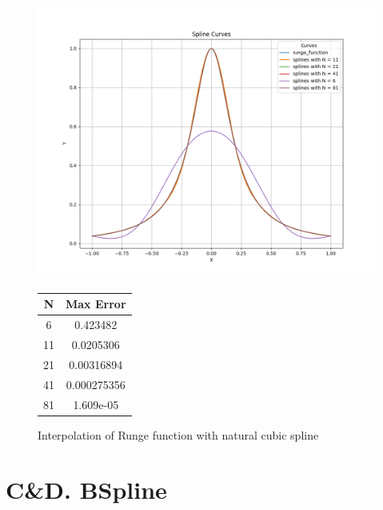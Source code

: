 \documentclass[a4paper]{article}
\begin{document}
\begin{figure}[h]
  \centering
  \begin{minipage}{0.6\textwidth} %
    \centering
    \includegraphics[width=\linewidth]{figures/A.png}
    \caption{Interpolation of Runge function with natural cubic spline}
    \label{fig:runge_interpolation}
  \end{minipage}
  \hfill 
  \begin{minipage}{0.35\textwidth} %
    \centering
    \renewcommand{\arraystretch}{1.2} %
    \begin{tabular}{|c|c|}
      \hline
      \textbf{N} & \textbf{Max Error} \\ \hline
      6  & 0.423482    \\ \hline
      11 & 0.0205306   \\ \hline
      21 & 0.00316894  \\ \hline
      41 & 0.000275356 \\ \hline
      81 & 1.609e-05   \\ \hline
    \end{tabular}
    \label{tab:max_error}
  \end{minipage}
\end{figure}

\newpage

\section*{C\&D. BSpline}
\end{document}
